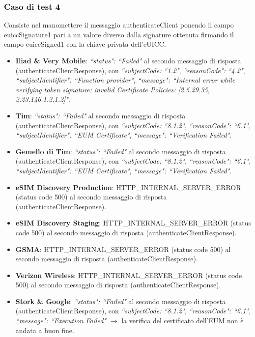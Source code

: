 \documentclass[10pt, oneside]{book}
\begin{document}
\subsubsection{Caso di test 4}
Consiste nel manomettere il messaggio authenticateClient ponendo il campo euiccSignature1 pari a un valore diverso dalla signature ottenuta firmando il campo euiccSigned1 con la chiave privata dell'eUICC.
\begin{itemize}
\item \textbf{Iliad \& Very Mobile}: \textit{``status": ``Failed"} al secondo messaggio di risposta (authenticateClientResponse), con \textit{``subjectCode: ``1.2"}, \textit{``reasonCode": ``4.2"}, \textit{``subjectIdentifier": ``Function provider"}, \textit{``message": ``Internal error while verifying token signature: invalid Certificate Policies: [2.5.29.35, 2.23.146.1.2.1.2]"}.
\item \textbf{Tim}: \textit{``status": ``Failed"} al secondo messaggio di risposta (authenticateClientResponse), con \textit{``subjectCode: ``8.1.2"}, \textit{``reasonCode": ``6.1"}, \textit{``subjectIdentifier": ``EUM Certificate"}, \textit{``message": ``Verification Failed"}.
\item \textbf{Gemello di Tim}: \textit{``status": ``Failed"} al secondo messaggio di risposta (authenticateClientResponse), con \textit{``subjectCode: ``8.1.2"}, \textit{``reasonCode": ``6.1"}, \textit{``subjectIdentifier": ``EUM Certificate"}, \textit{``message": ``Verification Failed"}.
\item \textbf{eSIM Discovery Production}: HTTP\_INTERNAL\_SERVER\_ERROR (status code 500) al secondo messaggio di risposta (authenticateClientResponse).
\item \textbf{eSIM Discovery Staging}: HTTP\_INTERNAL\_SERVER\_ERROR (status code 500) al secondo messaggio di risposta (authenticateClientResponse).
\item \textbf{GSMA}: HTTP\_INTERNAL\_SERVER\_ERROR (status code 500) al secondo messaggio di risposta (authenticateClientResponse).
\item \textbf{Verizon Wireless}: HTTP\_INTERNAL\_SERVER\_ERROR (status code 500) al secondo messaggio di risposta (authenticateClientResponse).
\item \textbf{Stork \& Google}: \textit{``status": ``Failed"} al secondo messaggio di risposta (authenticateClientResponse), con \textit{``subjectCode: ``8.1.2"}, \textit{``reasonCode": ``6.1"}, \textit{``message": ``Execution Failed"} $\rightarrow$ la verifica del certificato dell'EUM non è andata a buon fine.

\end{itemize}
\end{document}
